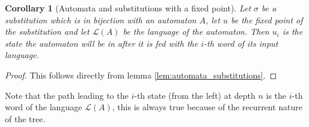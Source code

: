 \documentclass{article}
\newtheorem{corollary}[theorem]{Corollary}
\theoremstyle{definition}
\begin{document}
\begin{corollary}[Automata and substitutions with a fixed point] 
\label{cor:automata_substitutions_fixed_point}
Let $\sigma$ be a substitution which is in bijection with an automaton
$A$, let $u$ be the fixed point of the substitution and let $\mathcal{L}(A)$ 
be the language of the automaton. Then $u_i$ is the state the automaton 
will be in after it is fed with the $i$-th word of its input language.
\end{corollary}

\begin{proof}
This follows directly from lemma \ref{lem:automata_substitutions}.
\end{proof}

Note that the path leading to the $i$-th state (from the left) at depth $n$ 
is the $i$-th word of the language $\mathcal{L}(A)$, this is always true 
because of the recurrent nature of the tree.
\end{document}
